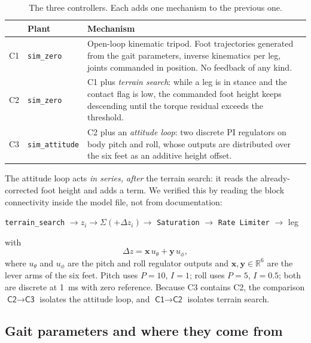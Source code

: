 \documentclass[11pt,a4paper]{article}
\newcommand{\Co}{\textsf{C1}}
\newcommand{\Ct}{\textsf{C2}}
\newcommand{\Cth}{\textsf{C3}}
\begin{document}
\begin{table}[htbp]
\centering
\caption{The three controllers. Each adds one mechanism to the previous one.}
\label{tab:controllers}
\small
\begin{tabular}{@{}llp{85mm}@{}}
\toprule
 & \textbf{Plant} & \textbf{Mechanism} \\
\midrule
\Co  & \texttt{sim\_zero} & Open-loop kinematic tripod. Foot trajectories
  generated from the gait parameters, inverse kinematics per leg, joints
  commanded in position. No feedback of any kind. \\[3pt]
\Ct  & \texttt{sim\_zero} & \Co{} plus \emph{terrain search}: while a leg is in
  stance and the contact flag is low, the commanded foot height keeps
  descending until the torque residual exceeds the threshold. \\[3pt]
\Cth & \texttt{sim\_attitude} & \Ct{} plus an \emph{attitude loop}: two
  discrete PI regulators on body pitch and roll, whose outputs are distributed
  over the six feet as an additive height offset. \\
\bottomrule
\end{tabular}
\end{table}

The attitude loop acts \emph{in series, after} the terrain search: it reads the
already-corrected foot height and adds a term. We verified this by reading the
block connectivity inside the model file, not from documentation:

\begin{center}
\texttt{terrain\_search} $\rightarrow z_i \rightarrow \Sigma(+\Delta z_i)
\rightarrow$ \texttt{Saturation} $\rightarrow$ \texttt{Rate Limiter}
$\rightarrow$ leg
\end{center}

with
\begin{equation}
\Delta z = \mathbf{x}\,u_\theta + \mathbf{y}\,u_\phi ,
\label{eq:dz}
\end{equation}
where $u_\theta$ and $u_\phi$ are the pitch and roll regulator outputs and
$\mathbf{x},\mathbf{y}\in\mathbb{R}^6$ are the lever arms of the six feet.
Pitch uses $P=10$, $I=1$; roll uses $P=5$, $I=0.5$; both are discrete at
\SI{1}{\milli\second} with zero reference. Because \Cth{} contains \Ct{}, the
comparison $\Ct\rightarrow\Cth$ isolates the attitude loop, and
$\Co\rightarrow\Ct$ isolates terrain search.

\subsection{Gait parameters and where they come from}
\label{sec:gait}
\end{document}

